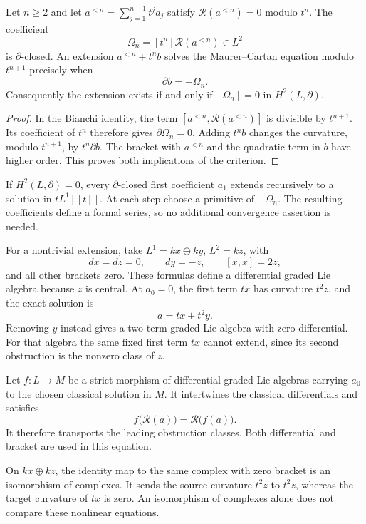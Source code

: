 \begin{proposition}\label{cbc:anomaly:extension}
Let $n\geq2$ and let $a^{<n}=\sum_{j=1}^{n-1}t^ja_j$ satisfy $\mathcal R(a^{<n})=0$ modulo $t^n$.
The coefficient
\[
 \Omega_n=[t^n]\mathcal R(a^{<n})\in L^2
\]
is $\partial$-closed.
An extension $a^{<n}+t^nb$ solves the Maurer--Cartan equation modulo $t^{n+1}$ precisely when
\[
 \partial b=-\Omega_n.
\]
Consequently the extension exists if and only if $[\Omega_n]=0$ in $H^2(L,\partial)$.
\end{proposition}
\begin{proof}
In the Bianchi identity, the term $[a^{<n},\mathcal R(a^{<n})]$ is divisible by $t^{n+1}$.
Its coefficient of $t^n$ therefore gives $\partial\Omega_n=0$.
Adding $t^nb$ changes the curvature, modulo $t^{n+1}$, by $t^n\partial b$.
The bracket with $a^{<n}$ and the quadratic term in $b$ have higher order.
This proves both implications of the criterion.
\end{proof}

If $H^2(L,\partial)=0$, every $\partial$-closed first coefficient $a_1$ extends recursively to a solution in $tL^1[[t]]$.
At each step choose a primitive of $-\Omega_n$.
The resulting coefficients define a formal series, so no additional convergence assertion is needed.

For a nontrivial extension, take $L^1=kx\oplus ky$, $L^2=kz$, with
\[
 dx=dz=0,\qquad dy=-z,\qquad [x,x]=2z,
\]
and all other brackets zero.
These formulas define a differential graded Lie algebra because $z$ is central.
At $a_0=0$, the first term $tx$ has curvature $t^2z$, and the exact solution is
\[
 a=tx+t^2y.
\]
Removing $y$ instead gives a two-term graded Lie algebra with zero differential.
For that algebra the same fixed first term $tx$ cannot extend, since its second obstruction is the nonzero class of $z$.

Let $f:L\to M$ be a strict morphism of differential graded Lie algebras carrying $a_0$ to the chosen classical solution in $M$.
It intertwines the classical differentials and satisfies
\[
 f\bigl(\mathcal R(a)\bigr)=\mathcal R\bigl(f(a)\bigr).
\]
It therefore transports the leading obstruction classes.
Both differential and bracket are used in this equation.

On $kx\oplus kz$, the identity map to the same complex with zero bracket is an isomorphism of complexes.
It sends the source curvature $t^2z$ to $t^2z$, whereas the target curvature of $tx$ is zero.
An isomorphism of complexes alone does not compare these nonlinear equations.

